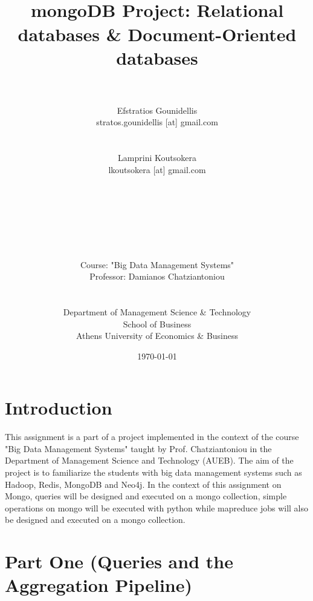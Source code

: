 \documentclass[11pt]{article}
\title{
    \horrule{0.5pt} \\ [0.4cm]
    \huge  {mongoDB Project: Relational databases \& Document-Oriented databases}\\
    \horrule{2pt} \\[0.5cm]	
\vspace{10px}
}
\author{\large Efstratios Gounidellis\\stratos.gounidellis [at] gmail.com \\ \\ \\ 
		Lamprini Koutsokera\\lkoutsokera [at] gmail.com \\ \\ \\ \\ \\ \\ \\ \\
Course: "Big Data Management Systems"
\\
Professor: Damianos Chatziantoniou
\\ \\ \\
\vspace{40px}
Department of Management Science \& Technology
\\ School of Business
\\
Athens University of Economics \& Business} %
\date{
\vfill \large\today} %
\begin{document}
    
\maketitle

\pagebreak 

\tableofcontents

\pagebreak 
 
\section{Introduction}\label{introduction}
This assignment is a part of a project implemented in the context of the course "Big Data Management Systems" taught by Prof. Chatziantoniou in the Department of Management Science and Technology (AUEB). The aim of the project is to familiarize the students with big data management systems such as Hadoop, Redis, MongoDB and Neo4j.
\newline\newline\noindent
In the context of this assignment on Mongo, queries will be designed and executed on a mongo collection, simple operations on mongo will be executed with python while mapreduce jobs will also be designed and executed on a mongo collection.

\section{Part One (Queries and the Aggregation Pipeline)}\label{part-one}
\end{document}
